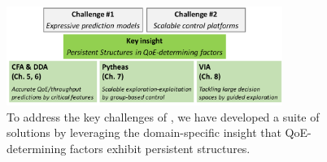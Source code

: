 
\begin{figure}[t!]
\centering
\includegraphics[width=0.8\textwidth]{figures/intro-contribution.pdf}
\caption{To address the key challenges
of \ddn, we have developed a suite of solutions by leveraging the domain-specific 
insight that QoE-determining factors
exhibit persistent structures.}
\label{fig:intro-contribution}
\end{figure}


